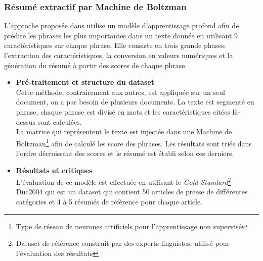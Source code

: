         \subsubsection{Résumé extractif par Machine de Boltzman}
            L'approche proposée dans \cite{boltzman} utilise un modèle d'apprentissage profond afin de prédire les phrases les plus importantes dans un texte donnée en utilisant 9 caractéristiques sur chaque phrase. Elle consiste en trois grande phases: l'extraction des caractéristiques, la conversion en valeurs numériques et la génération du résumé à partir des scores de chaque phrase. 

            \begin{itemize}[leftmargin=*]
                \item{\textbf{Pré-traitement et structure du dataset}}\\
                Cette méthode, contrairement aux autres, est appliquée sur un seul document, on a pas besoin de plusieurs documents. La texte est segmenté en phrase, chaque phrase est divisé en mots et les caractéristiques citées là-dessus sont calculées.\\

                La matrice qui représentent le texte est injectée dans une Machine de Boltzman\footnote{Type de réseau de neurones artificiels pour l'apprentissage non supervisé} afin de calculé les score des phrases. Les résultats sont triés dans l'ordre décroissant des scores et le résumé est établi selon ces derniers.\\

                \item{\textbf{Résultats et critiques}}\\
                L'évaluation de ce modèle est effectuée en utilisant le \emph{Gold Standard}\footnote{Dataset de référence construit par des experts linguistes, utilisé pour l'évaluation des résultats} Duc2004 qui est un dataset qui contient 50 articles de presse de différentes catégories et 4 à 5 résumés de référence pour chaque article.


\end{itemize}

